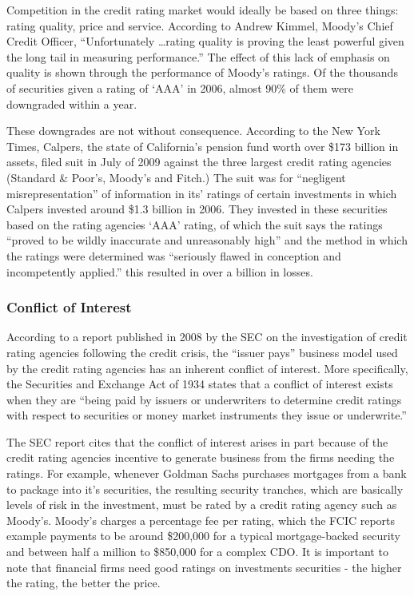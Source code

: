 \documentclass[11pt]{article}
\begin{document}
\begin{multicols}{2}
Competition in the credit rating market would ideally be based on three things: rating quality, price and service. \cite[p. 210]{govtReport} According to Andrew Kimmel, Moody's Chief Credit Officer, ``Unfortunately \ldots rating quality is proving the least powerful given the long tail in measuring performance.''  The effect of this lack of emphasis on quality is shown through the performance of Moody's ratings.  Of the thousands of securities given a rating of `AAA' in 2006, almost 90\% of them were downgraded within a year. \cite{ratingEthics, govtReport}

These downgrades are not without consequence.  According to the New York Times, Calpers, the state of California's pension fund worth over \$173 billion in assets, filed suit in July of 2009 against the three largest credit rating agencies (Standard \& Poor's, Moody's and Fitch.) The suit was for ``negligent misrepresentation'' of information in its' ratings of certain investments in which Calpers invested around \$1.3 billion in 2006.  They invested in these securities based on the rating agencies `AAA' rating, of which the suit says the ratings ``proved to be wildly inaccurate and unreasonably high'' and the method in which the ratings were determined was ``seriously flawed in conception and incompetently applied.''  this resulted in over a billion in losses. \cite{nyTimesCalpers} 

\subsubsection{Conflict of Interest}

According to a report published in 2008 by the SEC on the investigation of credit rating agencies following the credit crisis, the ``issuer pays'' business model used by the credit rating agencies has an inherent conflict of interest. \cite[p.23]{secCRAreport}  More specifically, the Securities and Exchange Act of 1934 states that a conflict of interest exists when they are ``being paid by issuers or underwriters to determine credit ratings with respect to securities or money market instruments they issue or underwrite.'' \cite[Rule 17g-5(b)(1)]{SEA} 

The SEC report cites that the conflict of interest arises in part because of the credit rating agencies incentive to generate business from the firms needing the ratings. \cite{secCRAreport}  For example, whenever Goldman Sachs purchases mortgages from a bank to package into it's securities, the resulting security tranches, which are basically levels of risk in the investment, must be rated by a credit rating agency such as Moody's.  Moody's charges a percentage fee per rating, which the FCIC reports example payments to be around \$200,000 for a typical mortgage-backed security and between half a million to \$850,000 for a complex CDO.\cite[p.146]{govtReport} It is important to note that financial firms need good ratings on investments securities - the higher the rating, the better the price.  


\end{multicols}
\end{document}
